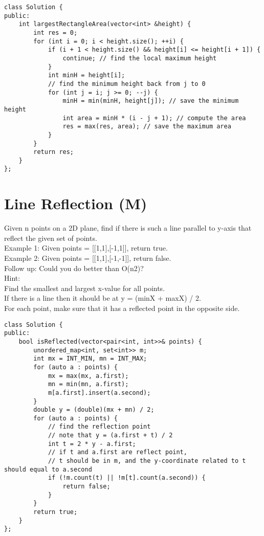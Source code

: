 \begin{lstlisting}
class Solution {
public:
    int largestRectangleArea(vector<int> &height) {
        int res = 0;
        for (int i = 0; i < height.size(); ++i) {
            if (i + 1 < height.size() && height[i] <= height[i + 1]) {
                continue; // find the local maximum height
            }
            int minH = height[i];
            // find the minimum height back from j to 0
            for (int j = i; j >= 0; --j) { 
                minH = min(minH, height[j]); // save the minimum height
                int area = minH * (i - j + 1); // compute the area
                res = max(res, area); // save the maximum area
            }
        }
        return res;
    }
};
\end{lstlisting}


\section{Line Reflection (M)}
Given n points on a 2D plane, find if there is such a line parallel to y-axis that reflect the given set of points.\\

Example 1:
Given points = [[1,1],[-1,1]], return true.\\

Example 2:
Given points = [[1,1],[-1,-1]], return false.\\

Follow up:
Could you do better than O(n2)?\\

Hint:\\
    Find the smallest and largest x-value for all points.\\
    If there is a line then it should be at y = (minX + maxX) / 2.\\
    For each point, make sure that it has a reflected point in the opposite side.\\

\begin{lstlisting}
class Solution {
public:
    bool isReflected(vector<pair<int, int>>& points) {
        unordered_map<int, set<int>> m;
        int mx = INT_MIN, mn = INT_MAX;
        for (auto a : points) {
            mx = max(mx, a.first);
            mn = min(mn, a.first);
            m[a.first].insert(a.second);
        }
        double y = (double)(mx + mn) / 2;
        for (auto a : points) {
            // find the reflection point
            // note that y = (a.first + t) / 2
            int t = 2 * y - a.first;
            // if t and a.first are reflect point, 
            // t should be in m, and the y-coordinate related to t should equal to a.second
            if (!m.count(t) || !m[t].count(a.second)) {
                return false;
            }
        }
        return true;
    }
};
\end{lstlisting}


